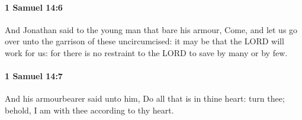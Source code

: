 		\paragraph{1 Samuel 14:6} %
			\label{1SAMUEL-14-6}

			And Jonathan said to the young man that bare his armour, Come, and let us go over unto the garrison of these uncircumcised: it may be that the LORD will work for us: for there is no restraint to the LORD to save by many or by few.


		\paragraph{1 Samuel 14:7} %
			\label{1SAMUEL-14-7}

			And his armourbearer said unto him, Do all that is in thine heart: turn thee; behold, I am with thee according to thy heart.


